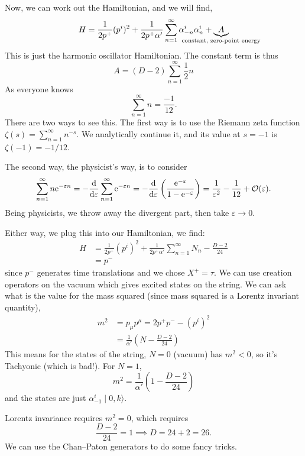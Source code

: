 Now, we can work out the Hamiltonian, and we will find,
\begin{equation}
H = \frac{1}{2p^{+}}(p^{i})^{2} +
\frac{1}{2p^{+}\alpha'}\sum^{\infty}_{n=1}\alpha^{i}_{-n}\alpha^{i}_{n}+\underbrace{A}_{\mathclap{\text{constant, zero-point energy}}}
\end{equation}
This is just the harmonic oscillator Hamiltonian. The constant term is
thus
\begin{equation}
A = (D - 2)\sum^{\infty}_{n=1}\frac{1}{2}n
\end{equation}
As everyone knows
\begin{equation}
\sum^{\infty}_{n=1}n = \frac{-1}{12}.
\end{equation}
There are two ways to see this. The first way is to use the Riemann zeta
function $\zeta(s) = \sum^{\infty}_{n=1}n^{-s}$. We analytically
continue it, and its value at $s=-1$ is $\zeta(-1)=-1/12$.

The second way, the physicist's way, is to consider
\begin{equation}
\sum^{\infty}_{n=1}n\mathrm{e}^{-\varepsilon n} = -\frac{\mathrm{d}}{\mathrm{d}\varepsilon}\sum^{\infty}_{n=1}\mathrm{e}^{-\varepsilon n}=-\frac{\mathrm{d}}{\mathrm{d}\varepsilon}\left(\frac{\mathrm{e}^{-\varepsilon}}{1-\mathrm{e}^{-\varepsilon}}\right)
=\frac{1}{\varepsilon^{2}}-\frac{1}{12}+\mathcal{O}(\varepsilon).
\end{equation}
Being physicists, we throw away the divergent part, then take $\varepsilon\to0$.

Either way, we plug this into our Hamiltonian, we find:
\begin{equation}
\begin{split}
H & =\frac{1}{2p^{+}}(p^{i})^{2} +
\frac{1}{2p^{+}\alpha'}\sum^{\infty}_{n=1}N_{n} - \frac{D-2}{24}\\
&= p^{-}
\end{split}
\end{equation}
since $p^{-}$ generates time translations and we chose $X^{+}=\tau$. We
can use creation operators on the vacuum which gives excited states on
the string. We can ask what is the value for the mass squared (since
mass squared is a Lorentz invariant quantity),
\begin{equation}
\begin{split}
m^{2} &= p_{\mu}p^{\mu} = 2p^{+}p^{-} - (p^{i})^{2}\\
&= \frac{1}{\alpha'}\left(N-\frac{D-2}{24}\right)
\end{split}
\end{equation}
This means for the states of the string, $N=0$ (vacuum) has $m^{2}<0$,
so it's Tachyonic (which is bad!). For $N=1$,
\begin{equation}
m^{2} = \frac{1}{\alpha'}\left(1 - \frac{D-2}{24}\right)
\end{equation}
and the states are just $\alpha^{i}_{-1}\mid0,k\rangle$.

Lorentz invariance requires $m^{2}=0$, which requires
\begin{equation}
\frac{D-2}{24}=1\implies D=24+2=26.
\end{equation}
We can use the Chan--Paton generators to do some fancy tricks.
